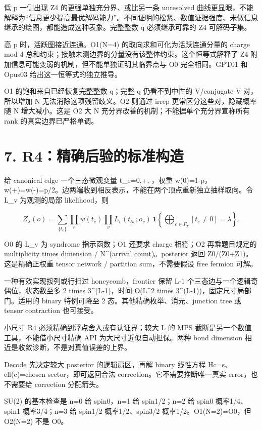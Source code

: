 \documentclass[11pt,a4paper]{article}
\begin{document}
低 p 一侧出现 Z4 的更强单独充分界、或比另一条 unresolved 曲线更显眼，不能解释为“信息更少提高最优解码能力”。不同证明的松紧、数值证据强度、未做信息继承的绘图，都能造成这种表象。完整整数 q 必须继承可靠的 Z4 可解码子集。

高 p 时，活跃图接近连通。O1(N=4) 的取向求和可化为活跃连通分量的 charge mod 4 总和约束；接触未测边界的分量没有该整体约束。这个恒等式解释了 Z4 附加信息可能变弱的机制，但不能单独证明其临界点与 O0 完全相同。GPT01 和 Opus03 给出这一恒等式的独立推导。

O1 的饱和来自已经恢复完整整数 q；完整 q 仍看不到中性的 V/conjugate-V 对，所以增加 N 无法消除这项残留歧义。O2 则通过 irrep 更常区分这些对，隐藏概率随 N 增大减小。这是 O2 大 N 充分界改善的机制；不能据单个充分界宣称所有 rank 的真实边界已严格单调。

\section*{7. R4：精确后验的标准构造}

给 canonical edge 一个三态微观变量 t\_e=0,+,-，权重 w(0)=1-p，w(+)=w(-)=p/2。边两端收到相反表示，不能在两个顶点重新独立抽样取向。令 L\_v 为观测的局部 likelihood，则

\[
Z_\lambda(o)=\sum_{\{t_e\}}
\prod_e w(t_e)\prod_v L_v(t_{\partial v};o_v)
\,\mathbf1\!\left\{\bigoplus_{e\in\Gamma_T}[t_e\ne0]=\lambda\right\}.
\]

O0 的 L\_v 为 syndrome 指示函数；O1 还要求 charge 相符；O2 再乘题目规定的 multiplicity times dimension / N\textasciicircum{}(arrival count)。posterior 返回 Z0/(Z0+Z1)。这是精确正权重 tensor network / partition sum，不需要假设 free fermion 可解。

一种有效实现按列或行扫过 honeycomb，frontier 保留 L-1 个三态边与一个逻辑奇偶位，状态数至多 2 times 3\textasciicircum{}(L-1)，时间 O(L\textasciicircum{}2 times 3\textasciicircum{}(L-1))，固定尺寸局部门。适用的 binary 特例可降至 2 态。其他精确枚举、消元、junction tree 或 tensor contraction 也可接受。

小尺寸 R4 必须精确到浮点舍入或有认证界；较大 L 的 MPS 截断是另一个数值工具，不能借小尺寸精确 API 为大尺寸近似自动担保。两种 bond dimension 相近是收敛诊断，不是对真值误差的上界。

Decode 先决定较大 posterior 的逻辑扇区，再解 binary 线性方程 Hc=s、ell(c)=chosen sector，即可返回合法 correction。它不需要推断唯一真实 error，也不需要给 correction 分配箭头。

SU(2) 的基本检查是 n=0 给 spin0，n=1 给 spin1/2；n=2 给 spin0 概率1/4、spin1 概率3/4；n=3 给 spin1/2 概率1/2、spin3/2 概率1/2。O1(N=2)=O0，但 O2(N=2) 不是 O0。
\end{document}
